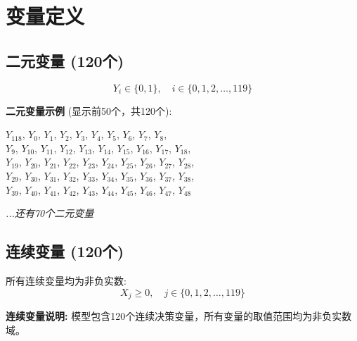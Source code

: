 \documentclass[a4paper,10pt]{article}
\begin{document}
\section{变量定义}

\subsection{二元变量 (120个)}

\begin{equation}
Y_i \in \{0,1\}, \quad i \in \{0, 1, 2, \ldots, 119\}
\end{equation}

\textbf{二元变量示例} (显示前50个，共120个):

{\small
$Y_{118}$, $Y_{0}$, $Y_{1}$, $Y_{2}$, $Y_{3}$, $Y_{4}$, $Y_{5}$, $Y_{6}$, $Y_{7}$, $Y_{8}$, \\
$Y_{9}$, $Y_{10}$, $Y_{11}$, $Y_{12}$, $Y_{13}$, $Y_{14}$, $Y_{15}$, $Y_{16}$, $Y_{17}$, $Y_{18}$, \\
$Y_{19}$, $Y_{20}$, $Y_{21}$, $Y_{22}$, $Y_{23}$, $Y_{24}$, $Y_{25}$, $Y_{26}$, $Y_{27}$, $Y_{28}$, \\
$Y_{29}$, $Y_{30}$, $Y_{31}$, $Y_{32}$, $Y_{33}$, $Y_{34}$, $Y_{35}$, $Y_{36}$, $Y_{37}$, $Y_{38}$, \\
$Y_{39}$, $Y_{40}$, $Y_{41}$, $Y_{42}$, $Y_{43}$, $Y_{44}$, $Y_{45}$, $Y_{46}$, $Y_{47}$, $Y_{48}$

\textit{...还有70个二元变量}
}

\subsection{连续变量 (120个)}

所有连续变量均为非负实数:
\begin{equation}
X_j \geq 0, \quad j \in \{0, 1, 2, \ldots, 119\}
\end{equation}

\textbf{连续变量说明:} 模型包含120个连续决策变量，所有变量的取值范围均为非负实数域。
\end{document}
